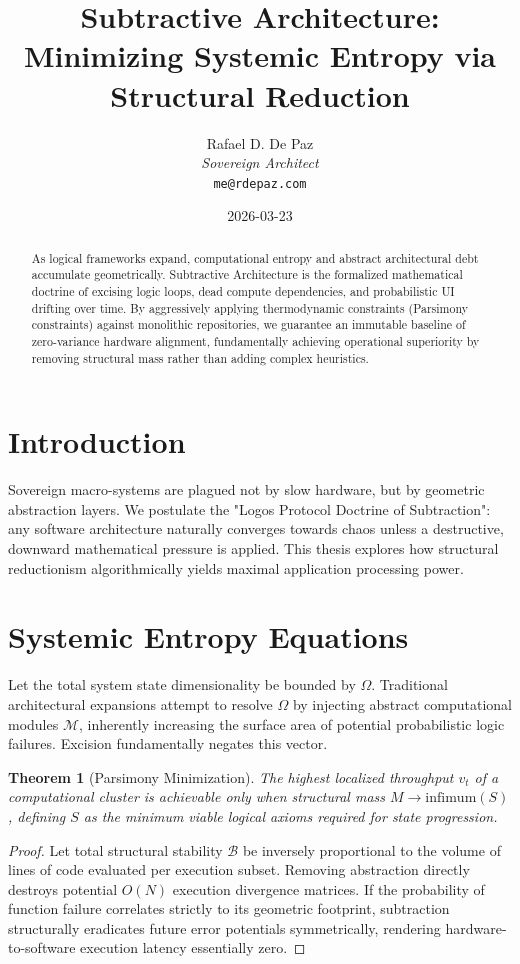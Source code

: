\documentclass[12pt, a4paper]{article}
\theoremstyle{plain}
\newtheorem{theorem}{Theorem}[section]
\theoremstyle{definition}
\begin{document}
\title{\textbf{Subtractive Architecture: Minimizing Systemic Entropy via Structural Reduction}}
\author{Rafael D. De Paz \\ \textit{Sovereign Architect} \\ \texttt{me@rdepaz.com}}
\date{2026-03-23}
\maketitle

\begin{abstract}
As logical frameworks expand, computational entropy and abstract architectural debt accumulate geometrically. Subtractive Architecture is the formalized mathematical doctrine of excising logic loops, dead compute dependencies, and probabilistic UI drifting over time. By aggressively applying thermodynamic constraints (Parsimony constraints) against monolithic repositories, we guarantee an immutable baseline of zero-variance hardware alignment, fundamentally achieving operational superiority by removing structural mass rather than adding complex heuristics.
\end{abstract}

\section{Introduction}
Sovereign macro-systems are plagued not by slow hardware, but by geometric abstraction layers. We postulate the "Logos Protocol Doctrine of Subtraction": any software architecture naturally converges towards chaos unless a destructive, downward mathematical pressure is applied. This thesis explores how structural reductionism algorithmically yields maximal application processing power.

\section{Systemic Entropy Equations}
Let the total system state dimensionality be bounded by $\Omega$. Traditional architectural expansions attempt to resolve $\Omega$ by injecting abstract computational modules $\mathcal{M}$, inherently increasing the surface area of potential probabilistic logic failures. Excision fundamentally negates this vector.

\begin{theorem}[Parsimony Minimization]
The highest localized throughput $v_t$ of a computational cluster is achievable only when structural mass $M \to \text{infimum}(S)$, defining $S$ as the minimum viable logical axioms required for state progression.
\end{theorem}
\begin{proof}
Let total structural stability $\mathcal{B}$ be inversely proportional to the volume of lines of code evaluated per execution subset. Removing abstraction directly destroys potential $O(N)$ execution divergence matrices. If the probability of function failure correlates strictly to its geometric footprint, subtraction structurally eradicates future error potentials symmetrically, rendering hardware-to-software execution latency essentially zero.
\end{proof}
\end{document}
